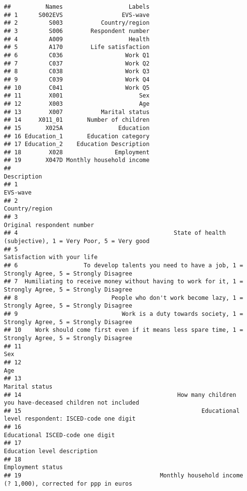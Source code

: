 \documentclass[]{article}
\begin{document}
\begin{verbatim}
##          Names                   Labels
## 1      S002EVS                 EVS-wave
## 2         S003           Country/region
## 3         S006        Respondent number
## 4         A009                   Health
## 5         A170        Life satisfaction
## 6         C036                  Work Q1
## 7         C037                  Work Q2
## 8         C038                  Work Q3
## 9         C039                  Work Q4
## 10        C041                  Work Q5
## 11        X001                      Sex
## 12        X003                      Age
## 13        X007           Marital status
## 14     X011_01       Number of children
## 15       X025A                Education
## 16 Education_1       Education category
## 17 Education_2    Education Description
## 18        X028               Employment
## 19       X047D Monthly household income
##                                                                                              Description
## 1                                                                                               EVS-wave
## 2                                                                                         Country/region
## 3                                                                             Original respondent number
## 4                                             State of health (subjective), 1 = Very Poor, 5 = Very good
## 5                                                                            Satisfaction with your life
## 6                   To develop talents you need to have a job, 1 = Strongly Agree, 5 = Strongly Disagree
## 7  Humiliating to receive money without having to work for it, 1 = Strongly Agree, 5 = Strongly Disagree
## 8                           People who don't work become lazy, 1 = Strongly Agree, 5 = Strongly Disagree
## 9                              Work is a duty towards society, 1 = Strongly Agree, 5 = Strongly Disagree
## 10    Work should come first even if it means less spare time, 1 = Strongly Agree, 5 = Strongly Disagree
## 11                                                                                                   Sex
## 12                                                                                                   Age
## 13                                                                                        Marital status
## 14                                             How many children you have-deceased children not included
## 15                                                    Educational level respondent: ISCED-code one digit
## 16                                                                      Educational ISCED-code one digit
## 17                                                                           Education level description
## 18                                                                                     Employment status
## 19                                        Monthly household income (? 1,000), corrected for ppp in euros
\end{verbatim}
\end{document}
